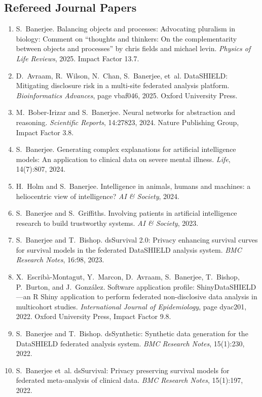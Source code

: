 \documentclass[11pt,a4paper]{article}
\begin{document}
\subsection*{Refereed Journal Papers}
\begin{enumerate}
  \item S.~Banerjee. Balancing objects and processes: Advocating pluralism in biology: Comment on ``thoughts and thinkers: On the complementarity between objects and processes'' by chris fields and michael levin. {\em Physics of Life Reviews}, 2025. Impact Factor 13.7.
  \item D.~Avraam, R.~Wilson, N.~Chan, S.~Banerjee, et~al. {DataSHIELD}: Mitigating disclosure risk in a multi-site federated analysis platform. {\em Bioinformatics Advances}, page vbaf046, 2025. Oxford University Press.
  \item M.~Bober-Irizar and S.~Banerjee. Neural networks for abstraction and reasoning. {\em Scientific Reports}, 14:27823, 2024. Nature Publishing Group, Impact Factor 3.8.
  \item S.~Banerjee. Generating complex explanations for artificial intelligence models: An application to clinical data on severe mental illness. {\em Life}, 14(7):807, 2024.
  \item H.~Holm and S.~Banerjee. Intelligence in animals, humans and machines: a heliocentric view of intelligence? {\em AI \& Society}, 2024.
  \item S.~Banerjee and S.~Griffiths. Involving patients in artificial intelligence research to build trustworthy systems. {\em AI \& Society}, 2023.
  \item S.~Banerjee and T.~Bishop. {dsSurvival 2.0}: Privacy enhancing survival curves for survival models in the federated {DataSHIELD} analysis system. {\em BMC Research Notes}, 16:98, 2023.
  \item X.~Escrib\`{a}-Montagut, Y.~Marcon, D.~Avraam, S.~Banerjee, T.~Bishop, P.~Burton, and J.~Gonz\'{a}lez. Software application profile: {ShinyDataSHIELD}---an {R Shiny} application to perform federated non-disclosive data analysis in multicohort studies. {\em International Journal of Epidemiology}, page dyac201, 2022. Oxford University Press, Impact Factor 9.8.
  \item S.~Banerjee and T.~Bishop. {dsSynthetic}: Synthetic data generation for the {DataSHIELD} federated analysis system. {\em BMC Research Notes}, 15(1):230, 2022.
  \item S.~Banerjee et~al. {dsSurvival}: Privacy preserving survival models for federated meta-analysis of clinical data. {\em BMC Research Notes}, 15(1):197, 2022.

\end{enumerate}
\end{document}
